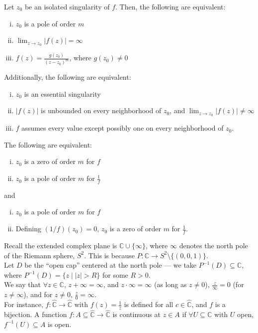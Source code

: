 \documentclass[10pt]{extarticle}
\newcommand{\C}{\mathbb{C}}
\begin{document}
  Let $z_0$  be an isolated singularity of $f$. Then, the following are equivalent:
  \begin{enumerate}[(i)]
    \item $z_0$ is a pole of order $m$
    \item $\lim_{z\rightarrow z_0}|f(z)| = \infty$
    \item $f(z) = \frac{g(z_0)}{(z-z_0)^m}$, where $g(z_0)\neq 0$
  \end{enumerate}
  Additionally, the following are equivalent:
  \begin{enumerate}[(i)]
    \item $z_0$ is an essential singularity
    \item $|f(z)|$ is unbounded on every neighborhood of $z_0$, and $\lim_{z\rightarrow z_0}|f(z)|\neq \infty$
    \item $f$ assumes every value except possibly one on every neighborhood of $z_0$.
  \end{enumerate}
  The following are equivalent:
  \begin{enumerate}[(i)]
    \item $z_0$ is a zero of order $m$ for $f$
    \item $z_0$ is a pole of order $m$ for $\frac{1}{f}$
  \end{enumerate}
  and
  \begin{enumerate}[(i)]
    \item $z_0$ is a pole of order $m$ for $f$
    \item Defining $(1/f)(z_0) = 0$, $z_0$ is a zero of order $m$ for $\frac{1}{f}$.
  \end{enumerate}
  Recall the extended complex plane is $\C \cup \{\infty\}$, where $\infty$ denotes the north pole of the Riemann sphere, $S^2$. This is because $P: \C\rightarrow S^{2}\setminus \{(0,0,1)\}$.\\

  Let $D$ be the ``open cap'' centered at the north pole --- we take $P^{-1}(D)\subseteq \C$, where $P^{-1}(D) = \{z\mid |z| > R\}$ for some $R > 0$.\\

  We say that $\forall z\in \C$, $z + \infty = \infty$, and $z\cdot \infty = \infty$ (as long as $z\neq 0$), $\frac{z}{\infty} = 0$ (for $z\neq \infty$), and for $z\neq 0$, $\frac{z}{0} = \infty$.\\

  For instance, $f: \hat{\C}\rightarrow \hat{\C}$ with $f(z) = \frac{1}{z}$ is defined for all $c\in \hat{\C}$, and $f$ is a bijection. A function $f: A\subseteq \hat{\C}\rightarrow \hat{\C}$ is continuous at $z\in A$ if $\forall U\subseteq \C$ with $U$ open, $f^{-1}(U)\subseteq A$ is open.\\
\end{document}

